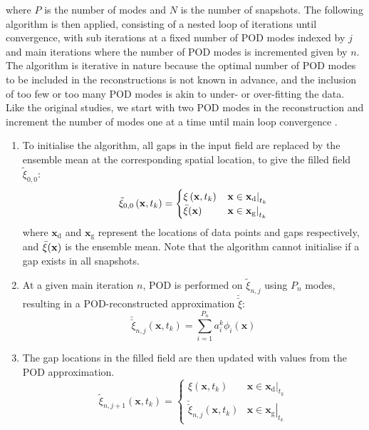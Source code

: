 \documentclass{article}
\begin{document}
where $P$ is the number of modes and $N$ is the number of snapshots. The following algorithm is then applied, consisting of a nested loop of iterations until convergence, with sub iterations at a fixed number of POD modes indexed by $j$ and main iterations where the number of POD modes is incremented given by $n$. The algorithm is iterative in nature because the optimal number of POD modes to be included in the reconstructions is not known in advance, and the inclusion of too few or too many POD modes is akin to under- or over-fitting the data. Like the original studies, we start with two POD modes in the reconstruction and increment the number of modes one at a time until main loop convergence \cite{saini2016development,venturi2004gappy}.
\begin{enumerate}
    \item To initialise the algorithm, all gaps in the input field are replaced by the ensemble mean at the corresponding spatial location, to give the filled field $\tilde{\xi}_{0,0}$: \\
    $$
\tilde{\xi}_{0,0}\left(\mathbf{x}, t_k\right)= \begin{cases}\xi\left(\mathbf{x}, t_k\right) & \left.\mathbf{x} \in \mathbf{x}_{\mathrm{d}}\right|_{t_k} \\ \Bar{\xi}(\mathbf{x}) & \left.\mathbf{x} \in \mathbf{x}_{\mathrm{g}}\right|_{t_k}\end{cases}
$$
where $\mathbf{x}_{\mathrm{d}}$ and $\mathbf{x}_{\mathrm{g}}$ represent the locations of data points and gaps respectively, and $\Bar{\xi}(\mathbf{x})$  is the ensemble mean. Note that the algorithm cannot initialise if a gap exists in all snapshots.  

\item At a given main iteration $n$, POD is performed on $\tilde{\xi}_{n,j}$ using $P_n$ modes, resulting in a POD-reconstructed approximation $\breve{\breve{\xi}}$:
$$
\breve{\breve{\xi}}_{n,j}\left(\mathbf{x}, t_k\right)=\sum_{i=1}^{P_n} a_i^k \phi_i(\mathbf{x})
$$

\item The gap locations in the filled field are then updated with values from the POD approximation.
$$
\tilde{\xi}_{n, j+1}\left(\mathbf{x}, t_k\right)= \begin{cases}\xi\left(\mathbf{x}, t_k\right) & \left.\mathbf{x} \in \mathbf{x}_{\mathrm{d}}\right|_{t_k} \\ \breve{\breve{\xi}}_{n, j}\left(\mathbf{x}, t_k\right) & \left.\mathbf{x} \in \mathbf{x}_{\mathrm{g}}\right|_{t_k}\end{cases}
$$


\end{enumerate}
\end{document}
